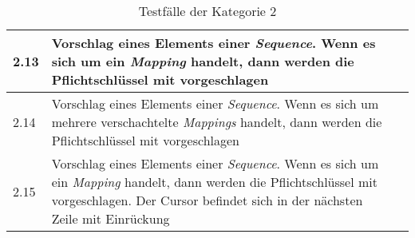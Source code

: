 \begin{table}[htp]
\begin{tabularx}{\columnwidth}{lXl}
        \midrule
        2.13                                                                  & Vorschlag eines Elements einer \textit{Sequence}. Wenn es sich um ein \textit{Mapping} handelt, dann werden die Pflichtschlüssel mit vorgeschlagen                                                                &  \\
        \midrule
        2.14                                                                  & Vorschlag eines Elements einer \textit{Sequence}. Wenn es sich um mehrere verschachtelte \textit{Mappings} handelt, dann werden die Pflichtschlüssel mit vorgeschlagen                                            &  \\
        \midrule
        2.15                                                                  & Vorschlag eines Elements einer \textit{Sequence}. Wenn es sich um ein \textit{Mapping} handelt, dann werden die Pflichtschlüssel mit vorgeschlagen. Der Cursor befindet sich in der nächsten Zeile mit Einrückung &  \\
        \bottomrule
    \end{tabularx}
    \caption{Testfälle der Kategorie 2}
    \label{tbl:evaluation-test-cases-category-2}
\end{table}



